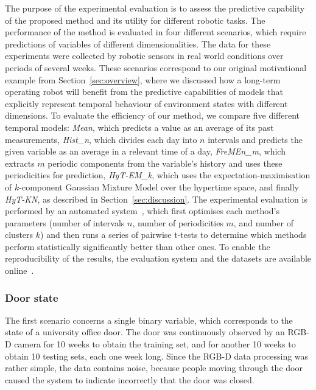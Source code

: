The purpose of the experimental evaluation is to assess the predictive capability of the proposed method and its utility for different robotic tasks.
The performance of the method is evaluated in four different scenarios, which require predictions of variables of different dimensionalities.
The data for these experiments were collected by robotic sensors in real world conditions over periods of several weeks.
These scenarios correspond to our original motivational example from Section~\ref{sec:overview}, where we discussed how a long-term operating robot will benefit from the predictive capabilities of models that explicitly represent temporal behaviour of environment states with different dimensions.
To evaluate the efficiency of our method, we compare five different temporal models: \textit{Mean}, which predicts a value as an average of its past measurements, \textit{Hist\_n}, which divides each day into $n$ intervals and predicts the given variable as an average in a relevant time of a day, \textit{FreMEn\_m}, which extracts $m$ periodic components from the variable's history and uses these periodicities for prediction, \textit{HyT-EM\_k}, which uses the expectation-maximisation of $k$-component Gaussian Mixture Model over the hypertime space, and finally \textit{HyT-KN}, as described in Section~\ref{sec:discussion}.
The experimental evaluation is performed by an automated system~\cite{krajnik2017towards}, which first optimises each method's parameters (number of intervals $n$, number of periodicities $m$, and number of clusters $k$) and then runs a series of pairwise t-tests to determine which methods perform statistically significantly better than other ones.
To enable the reproducibility of the results, the evaluation system and the datasets are available online~\cite{fremen-www}.

\subsubsection{Door state}

The first scenario concerns a single binary variable, which corresponds to the state of a university office door.
The door was continuously observed by an RGB-D camera for 10 weeks to obtain the training set, and for another 10 weeks to obtain 10 testing sets, each one week long.
Since the RGB-D data processing was rather simple, the data contains noise, because people moving through the door caused the system to indicate incorrectly that the door was closed.

